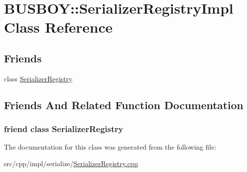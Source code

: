 \hypertarget{classBUSBOY_1_1SerializerRegistryImpl}{
\section{BUSBOY::SerializerRegistryImpl Class Reference}
\label{classBUSBOY_1_1SerializerRegistryImpl}
}
\subsection*{Friends}
\begin{DoxyCompactItemize}
\item 
class \hyperlink{classBUSBOY_1_1SerializerRegistryImpl_a6f557ca0e35129bbe7e754b8b9362d11}{SerializerRegistry}
\end{DoxyCompactItemize}


\subsection{Friends And Related Function Documentation}
\hypertarget{classBUSBOY_1_1SerializerRegistryImpl_a6f557ca0e35129bbe7e754b8b9362d11}{
\subsubsection[{SerializerRegistry}]{\setlength{\rightskip}{0pt plus 5cm}friend class {\bf SerializerRegistry}}}
\label{classBUSBOY_1_1SerializerRegistryImpl_a6f557ca0e35129bbe7e754b8b9362d11}


The documentation for this class was generated from the following file:\begin{DoxyCompactItemize}
\item 
src/cpp/impl/serialize/\hyperlink{SerializerRegistry_8cpp}{SerializerRegistry.cpp}\end{DoxyCompactItemize}
